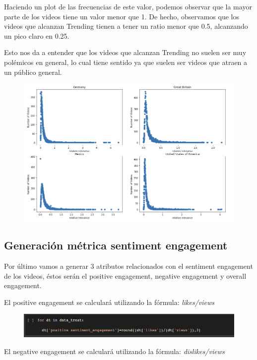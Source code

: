 \documentclass[a4paper,12pt]{article}
\begin{document}
Haciendo un plot de las frecuencias de este valor, podemos observar que la mayor parte de los videos tiene un valor menor que  1.  De hecho, observamos que los videos que alcanzan Trending tienen a tener un ratio menor que 0.5, alcanzando un pico claro en 0.25.

Esto nos da a entender que los videos que alcanzan Trending no suelen ser muy pol\'emicos en general, lo cual tiene sentido ya que suelen ser videos que atraen a un p\'ublico general.

\begin{figure}[h!]
\centering
\includegraphics[width=14cm]{rel_relevance_plot.png}
\end{figure}

\subsection{Generaci\'on m\'etrica sentiment engagement}
Por \'ultimo vamos a generar 3 atributos relacionados con el sentiment engagement de los videos, \'estos ser\'an el positive engagement, negative engagement y overall engagement.

El positive engagement se calcular\'a utilizando la f\'ormula: {\itshape likes/views}

\begin{figure}[h!]
\centering
\includegraphics[width=13cm]{pos_eng_gen.png}
\end{figure}

El negative engagement se calcular\'a utilizando la f\'ormula: {\itshape dislikes/views}
\end{document}
